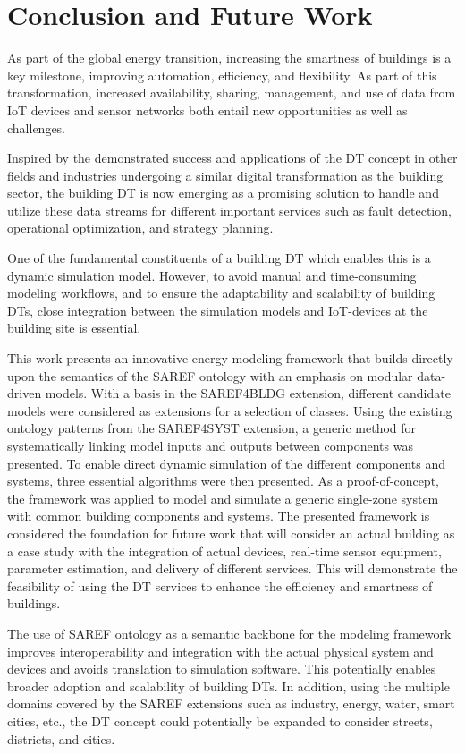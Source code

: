 \section{Conclusion and Future Work}

As part of the global energy transition, increasing the smartness of buildings is a key milestone, improving automation, efficiency, and flexibility. As part of this transformation, increased availability, sharing, management, and use of data from IoT devices and sensor networks both entail new opportunities as well as challenges. 

Inspired by the demonstrated success and applications of the DT concept in other fields and industries undergoing a similar digital transformation as the building sector, the building DT is now emerging as a promising solution to handle and utilize these data streams for different important services such as fault detection, operational optimization, and strategy planning. 

One of the fundamental constituents of a building DT which enables this is a dynamic simulation model. However, to avoid manual and time-consuming modeling workflows, and to ensure the adaptability and scalability of building DTs, close integration between the simulation models and IoT-devices at the building site is essential. 

This work presents an innovative energy modeling framework that builds directly upon the semantics of the SAREF ontology with an emphasis on modular data-driven models. With a basis in the SAREF4BLDG extension, different candidate models were considered as extensions for a selection of classes. Using the existing ontology patterns from the SAREF4SYST extension, a generic method for systematically linking model inputs and outputs between components was presented. To enable direct dynamic simulation of the different components and systems, three essential algorithms were then presented. As a proof-of-concept, the framework was applied to model and simulate a generic single-zone system with common building components and systems. 
The presented framework is considered the foundation for future work that will consider an actual building as a case study with the integration of actual devices, real-time sensor equipment, parameter estimation, and delivery of different services. This will demonstrate the feasibility of using the DT services to enhance the efficiency and smartness of buildings.

The use of SAREF ontology as a semantic backbone for the modeling framework improves interoperability and integration with the actual physical system and devices and avoids translation to simulation software. This potentially enables broader adoption and scalability of building DTs. In addition, using the multiple domains covered by the SAREF extensions such as industry, energy, water, smart cities, etc., the DT concept could potentially be expanded to consider streets, districts, and cities. 



